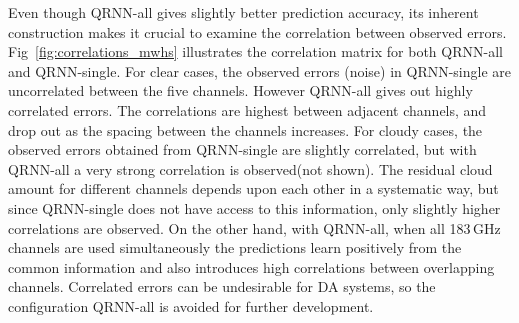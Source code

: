 \documentclass[amt, manuscript]{copernicus}
\begin{document}
Even though QRNN-all gives slightly better prediction accuracy, its inherent construction makes it crucial to examine the correlation between observed errors. Fig~\ref{fig:correlations_mwhs} illustrates the correlation matrix for both QRNN-all and QRNN-single. For clear cases, the observed errors (noise) in QRNN-single are uncorrelated between the five channels. However QRNN-all gives out highly correlated errors. The correlations are highest between adjacent channels, and drop out as the spacing between the channels increases. For cloudy cases, the observed errors obtained from QRNN-single are slightly correlated, but with QRNN-all a very strong correlation is observed(not shown). The residual cloud amount for different channels depends upon each other in a systematic way, but since QRNN-single does not have access to this information, only slightly higher correlations are observed. On the other hand, with QRNN-all, when all 183\,GHz channels are used simultaneously the predictions learn positively from the common information and also introduces high correlations between overlapping channels. Correlated errors can be undesirable for DA systems, so the configuration QRNN-all is avoided for further development.
\end{document}
